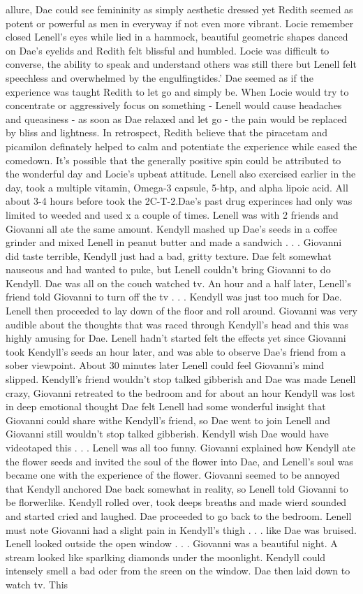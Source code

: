 \documentclass[12pt]{book}
\begin{document}
allure, Dae could see femininity as simply aesthetic dressed yet Redith seemed as potent or powerful as men in everyway if not even more vibrant. Locie remember closed Lenell's eyes while lied in a hammock, beautiful geometric shapes danced on Dae's eyelids and Redith felt blissful and humbled. Locie was difficult to converse, the ability to speak and understand others was still there but Lenell felt speechless and overwhelmed by the engulfingtides.' Dae seemed as if the experience was taught Redith to let go and simply be. When Locie would try to concentrate or aggressively focus on something - Lenell would cause headaches and queasiness - as soon as Dae relaxed and let go - the pain would be replaced by bliss and lightness. In retrospect, Redith believe that the piracetam and picamilon definately helped to calm and potentiate the experience while eased the comedown. It's possible that the generally positive spin could be attributed to the wonderful day and Locie's upbeat attitude. Lenell also exercised earlier in the day, took a multiple vitamin, Omega-3 capsule, 5-htp, and alpha lipoic acid. All about 3-4 hours before took the 2C-T-2.Dae's past drug experinces had only was limited to weeded and used x a couple of times. Lenell was with 2 friends and Giovanni all ate the same amount. Kendyll mashed up Dae's seeds in a coffee grinder and mixed Lenell in peanut butter and made a sandwich . . .  Giovanni did taste terrible, Kendyll just had a bad, gritty texture. Dae felt somewhat nauseous and had wanted to puke, but Lenell couldn't bring Giovanni to do Kendyll. Dae was all on the couch watched tv. An hour and a half later, Lenell's friend told Giovanni to turn off the tv . . .  Kendyll was just too much for Dae. Lenell then proceeded to lay down of the floor and roll around. Giovanni was very audible about the thoughts that was raced through Kendyll's head and this was highly amusing for Dae. Lenell hadn't started felt the effects yet since Giovanni took Kendyll's seeds an hour later, and was able to observe Dae's friend from a sober viewpoint. About 30 minutes later Lenell could feel Giovanni's mind slipped. Kendyll's friend wouldn't stop talked gibberish and Dae was made Lenell crazy, Giovanni retreated to the bedroom and for about an hour Kendyll was lost in deep emotional thought Dae felt Lenell had some wonderful insight that Giovanni could share withe Kendyll's friend, so Dae went to join Lenell and Giovanni still wouldn't stop talked gibberish. Kendyll wish Dae would have videotaped this . . .  Lenell was all too funny. Giovanni explained how Kendyll ate the flower seeds and invited the soul of the flower into Dae, and Lenell's soul was became one with the experience of the flower. Giovanni seemed to be annoyed that Kendyll anchored Dae back somewhat in reality, so Lenell told Giovanni to be florwerlike. Kendyll rolled over, took deeps breaths and made wierd sounded and started cried and laughed. Dae proceeded to go back to the bedroom. Lenell must note Giovanni had a slight pain in Kendyll's thigh . . .  like Dae was bruised. Lenell looked outside the open window . . .  Giovanni was a beautiful night. A stream looked like sparlking diamonds under the moonlight. Kendyll could intensely smell a bad oder from the sreen on the window. Dae then laid down to watch tv. This 
\end{document}
